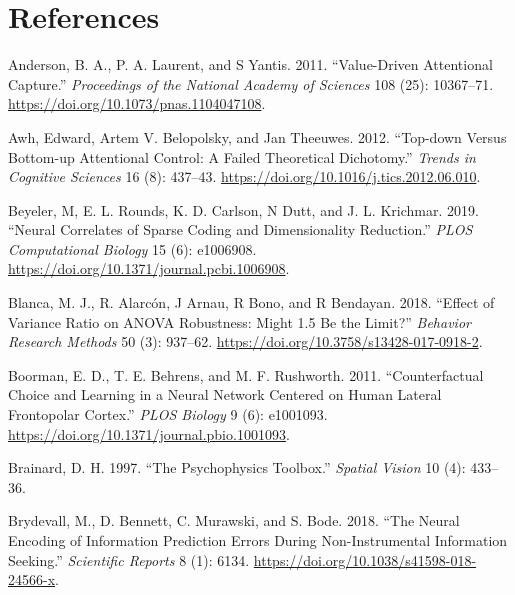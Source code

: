 \documentclass[11pt,halfline,a4paper,]{ouparticle}
\newlength{\cslhangindent}
\newenvironment{cslreferences}%
  {\setlength{\parindent}{0pt}%
  \everypar{\setlength{\hangindent}{\cslhangindent}}\ignorespaces}%
  {\par}
\begin{document}
\hypertarget{references}{%
\section{References}\label{references}}

\label{sec:refs}

\hypertarget{refs}{}
\begin{cslreferences}
\leavevmode\hypertarget{ref-andersonValuedrivenAttentionalCapture2011}{}%
Anderson, B. A., P. A. Laurent, and S Yantis. 2011. ``Value-Driven Attentional Capture.'' \emph{Proceedings of the National Academy of Sciences} 108 (25): 10367--71. \url{https://doi.org/10.1073/pnas.1104047108}.

\leavevmode\hypertarget{ref-awhTopdownBottomupAttentional2012}{}%
Awh, Edward, Artem V. Belopolsky, and Jan Theeuwes. 2012. ``Top-down Versus Bottom-up Attentional Control: A Failed Theoretical Dichotomy.'' \emph{Trends in Cognitive Sciences} 16 (8): 437--43. \url{https://doi.org/10.1016/j.tics.2012.06.010}.

\leavevmode\hypertarget{ref-beyelerNeuralCorrelatesSparse2019}{}%
Beyeler, M, E. L. Rounds, K. D. Carlson, N Dutt, and J. L. Krichmar. 2019. ``Neural Correlates of Sparse Coding and Dimensionality Reduction.'' \emph{PLOS Computational Biology} 15 (6): e1006908. \url{https://doi.org/10.1371/journal.pcbi.1006908}.

\leavevmode\hypertarget{ref-blancaEffectVarianceRatio2018}{}%
Blanca, M. J., R. Alarcón, J Arnau, R Bono, and R Bendayan. 2018. ``Effect of Variance Ratio on ANOVA Robustness: Might 1.5 Be the Limit?'' \emph{Behavior Research Methods} 50 (3): 937--62. \url{https://doi.org/10.3758/s13428-017-0918-2}.

\leavevmode\hypertarget{ref-boormanCounterfactualChoiceLearning2011a}{}%
Boorman, E. D., T. E. Behrens, and M. F. Rushworth. 2011. ``Counterfactual Choice and Learning in a Neural Network Centered on Human Lateral Frontopolar Cortex.'' \emph{PLOS Biology} 9 (6): e1001093. \url{https://doi.org/10.1371/journal.pbio.1001093}.

\leavevmode\hypertarget{ref-brainardPsychophysicsToolbox1997}{}%
Brainard, D. H. 1997. ``The Psychophysics Toolbox.'' \emph{Spatial Vision} 10 (4): 433--36.

\leavevmode\hypertarget{ref-brydevallNeuralEncodingInformation2018}{}%
Brydevall, M., D. Bennett, C. Murawski, and S. Bode. 2018. ``The Neural Encoding of Information Prediction Errors During Non-Instrumental Information Seeking.'' \emph{Scientific Reports} 8 (1): 6134. \url{https://doi.org/10.1038/s41598-018-24566-x}.


\end{cslreferences}
\end{document}
